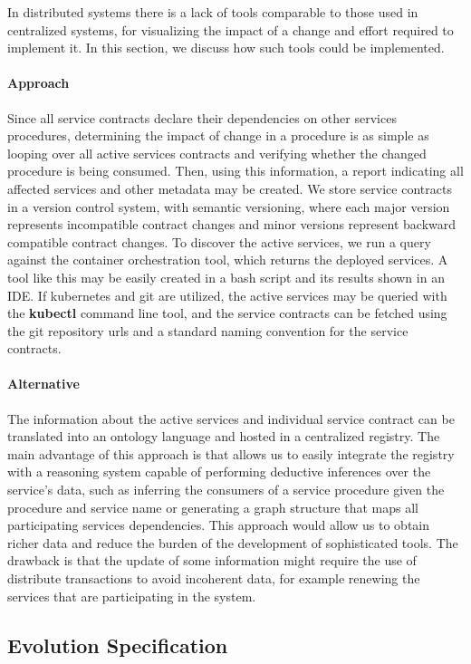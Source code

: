 In distributed systems there is a lack of tools
comparable to those used in centralized systems, for visualizing the impact of a change and effort required to implement it.
In this section, we discuss how such tools could be implemented.

\paragraph{Approach}
Since all service contracts declare their dependencies on other services procedures, determining the impact of change in a procedure is as simple as
looping over all active services contracts and verifying whether the changed procedure is being consumed.
Then, using this information, a report indicating all affected services and other metadata may be created.
We store service contracts in a version control system, with semantic versioning, where
each major version represents incompatible contract changes and minor versions represent backward compatible contract changes.
To discover the active services, we run a query against the container orchestration tool, which returns the deployed services.
A tool like this may be easily created in a bash script and its results shown in an IDE.
If kubernetes and git are utilized, the active services may be queried with the \textbf{kubectl} command line tool,
and the service contracts can be fetched using the git repository urls and a standard naming convention for the service contracts.

\paragraph{Alternative}
The information about the active services and individual service contract can be translated into an ontology language and hosted in a centralized registry.
The main advantage of this approach is that allows us to easily integrate the registry with a reasoning system capable of performing deductive inferences over the service's data, such as
inferring the consumers of a service procedure given the procedure and service name or generating a graph structure that maps all participating services dependencies.
This approach would allow us to obtain richer data and reduce the burden of the development of sophisticated tools.
The drawback is that the update of some information might require the use of distribute transactions to avoid incoherent data,
for example renewing the services that are participating in the system.

\subsection{Evolution Specification} %
\label{sec:evolution_specification}

